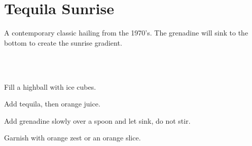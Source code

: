 \section[Tequila Sunrise]{
    Tequila Sunrise~
}

\begin{recipestats}[
        servings=1,
        preptime=5~\minute,
        original=\citeauthor{ibaTequilaSunrise}~\cite{ibaTequilaSunrise},
    ]
\end{recipestats}

\begin{recipeabstract}
    A contemporary classic hailing from the 1970's.
    The grenadine will sink to the bottom to create the sunrise gradient.
\end{recipeabstract}

\begin{ingredientcolumns}[1]
    \begin{ingredientblock}
        \\
        \\
    \end{ingredientblock}
\end{ingredientcolumns}

\begin{preparation}
\item Fill a highball with ice cubes.
\item Add tequila, then orange juice.
\item Add grenadine slowly over a spoon and let sink, do not stir.
\item Garnish with orange zest or an orange slice.
\end{preparation}

\recipeend%
